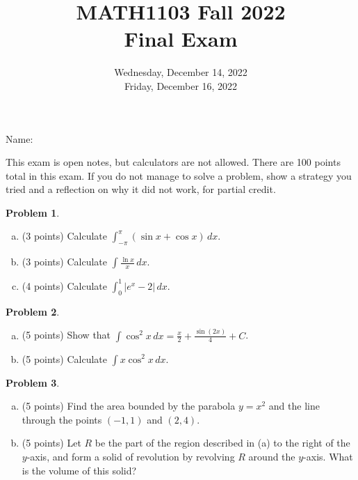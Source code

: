 \documentclass[11pt,oneside]{amsart}
\title{MATH1103 Fall 2022\\
Final Exam}
\author{Wednesday, December 14, 2022\\
Friday, December 16, 2022}
\theoremstyle{definition}
\newtheorem{problem}{Problem}
\begin{document}
\maketitle

Name: \underline{\hspace{6cm}}

This exam is open notes, but calculators are not allowed. There are 100 points total in this exam. If you do not manage to solve a problem, show a strategy you tried and a reflection on why it did not work, for partial credit.

\begin{problem}
\leavevmode\begin{enumerate}[(a)]
  \item (3 points) Calculate $\displaystyle\int_{-\pi}^\pi(\sin x+\cos x)\,dx$.
        \vfill
  \item (3 points) Calculate $\displaystyle\int \frac{\ln x}x\,dx$.
        \vfill
  \item (4 points) Calculate $\displaystyle\int_0^{1}|e^x-2|\,dx$.
        \vfill
\end{enumerate}
\end{problem}

\newpage

\begin{problem}
\leavevmode\begin{enumerate}[(a)]
  \item (5 points) Show that $\displaystyle\int\cos^2 x\,dx=\frac x2+\frac{\sin(2x)}4+C$.
        \vfill
  \item (5 points) Calculate $\displaystyle\int x\cos^2 x\,dx$.
        \vfill
\end{enumerate}
\end{problem}

\newpage

\begin{problem}
\leavevmode\begin{enumerate}[(a)]
  \item (5 points) Find the area bounded by the parabola $y=x^2$ and the line through the points $(-1,1)$ and $(2,4)$.
        \vfill
  \item (5 points) Let $R$ be the part of the region described in (a) to the right of the $y$-axis, and form a solid of revolution by revolving $R$ around the $y$-axis. What is the volume of this solid?
        \vfill
\end{enumerate}
\end{problem}
\end{document}
